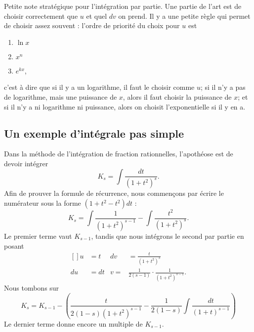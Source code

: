 Petite note stratégique pour l'intégration par partie. Une partie de l'art est de choisir correctement que $u$ et quel $dv$ on prend. Il y a une petite règle qui permet de choisir assez souvent : l'ordre de priorité du choix pour $u$ est
\let\OldTheEnumi\theenumi
\renewcommand{\theenumi}{\arabic{enumi}}
\begin{enumerate}
\item $\ln x$
\item $x^n$
\item $ e^{kx}$,
\end{enumerate}
\let\theenumi\OldTheEnumi
c'est à dire que si il y a un logarithme, il faut le choisir comme $u$; si il n'y a pas de logarithme, mais une puissance de $x$, alors il faut choisir la puissance de $x$; et si il n'y a ni logarithme ni puissance, alors on choisit l'exponentielle si il y en a.

\subsection{Un exemple d'intégrale pas simple}



Dans la méthode de l'intégration de fraction rationnelles, l'apothéose est de devoir intégrer 
\begin{equation}
	K_s=\int \frac{ dt }{ (1+t^2)^s }.
\end{equation}
Afin de prouver la formule de récurrence, nous commençons par écrire le numérateur sous la forme $(1+t^2-t^2)dt$ :
\begin{equation}
	K_s=\int \frac{ 1 }{ (1+t^2)^{s-1} }-\int \frac{ t^2 }{ (1+t^2)^s }.
\end{equation}
Le premier terme vaut $K_{s-1}$, tandis que nous intégrons le second par partie en posant
\begin{equation}
	\begin{aligned}[]
		u&=t		&	dv&=\frac{ t }{ (1+t^2)^s }\\
		du&=dt		&	v=&\frac{1}{ 2(s-1) }\cdot \frac{1}{ (1+t^2)^{s-1} }.
	\end{aligned}
\end{equation}
Nous tombons sur
\begin{equation}
	K_{s}=K_{s-1}-\left( \frac{ t }{ 2(1-s)(1+t^2)^{s-1} } - \frac{1}{ 2(1-s) }\int \frac{ dt }{ (1+t)^{s-1} } \right)
\end{equation}
Le dernier terme donne encore un multiple de $K_{s-1}$.

